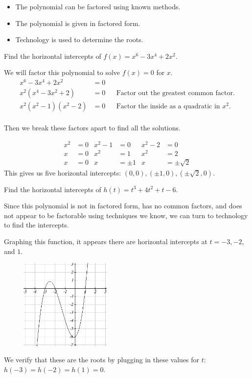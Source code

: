 \begin{itemize}
	\item The polynomial can be factored using known methods.
	\item The polynomial is given in factored form.
	\item Technology is used to determine the roots.
\end{itemize}
\begin{example}
Find the horizontal intercepts of $f(x)=x^6-3x^4+2x^2$.

\begin{solution} We will factor this polynomial to solve $f(x)=0$ for $x$.
\begin{align*}
	x^6-3x^4+2x^2    &= 0& &\\
  x^2(x^4-3x^2+2)  &= 0& &\mbox{Factor out the greatest common factor.} \\
  x^2(x^2-1)(x^2-2)&= 0& &\mbox{Factor the inside as a quadratic in } x^2. \\
\end{align*}

Then we break these factors apart to find all the solutions.

\begin{align*}
    x^2 &= 0 & x^2-1 &= 0     & x^2-2 &= 0 \\
		x   &= 0 & x^2   &= 1     & x^2   &= 2 \\
    x   &= 0 & x     &= \pm 1 & x     &= \pm\sqrt{2}
\end{align*}
This gives us five horizontal intercepts: $(0, 0), (\pm 1, 0), \left(\pm \sqrt{2}, 0\right)$.
\end{solution}\end{example}
\begin{example}
Find the horizontal intercepts of $h(t)=t^3+4t^2+t-6$.

\begin{solution} Since this polynomial is not in factored form, has no common factors, and does not appear to be factorable using techniques we know, we can turn to technology to find the intercepts.

Graphing this function, it appears there are horizontal intercepts at $t= -3, -2$, and $1$.

\begin{figure}[!ht]
\centering
\includegraphics[width=0.4\textwidth]{img/chap1/sec1-5/image067.png}
\caption{}
\end{figure}
\noindent We verify that these are the roots by plugging in these values for $t$: $h(-3)=h(-2)=h(1)=0$.
\end{solution}\end{example}
